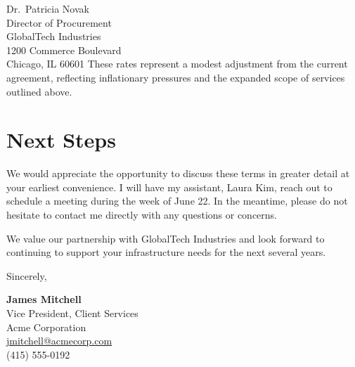\documentclass[
    language=english,
    doctype=letter,
    institution=none,
]{../../omnilatex}
\begin{document}
\begin{letter}{Dr.\ Patricia Novak\\
    Director of Procurement\\
    GlobalTech Industries\\
    1200 Commerce Boulevard\\
    Chicago, IL 60601}
These rates represent a modest adjustment from the current agreement, reflecting
inflationary pressures and the expanded scope of services outlined above.

\section*{Next Steps}

We would appreciate the opportunity to discuss these terms in greater detail at
your earliest convenience. I will have my assistant, Laura Kim, reach out to
schedule a meeting during the week of June 22. In the meantime, please do not
hesitate to contact me directly with any questions or concerns.

We value our partnership with GlobalTech Industries and look forward to
continuing to support your infrastructure needs for the next several years.

\closing{Sincerely,}

\vspace{1.5cm}
\textbf{James Mitchell}\\
Vice President, Client Services\\
Acme Corporation\\
\href{mailto:jmitchell@acmecorp.com}{jmitchell@acmecorp.com}\\
(415) 555-0192

\end{letter}
\end{document}
